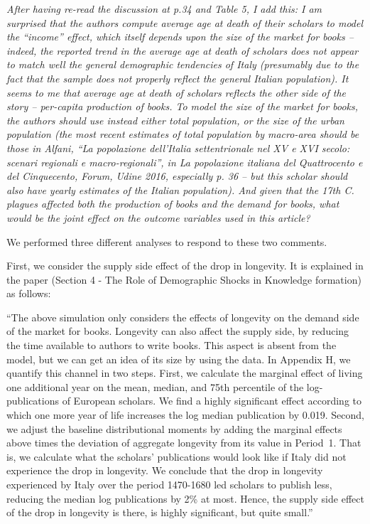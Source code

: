 \documentclass[12pt]{article}
\begin{document}
\textit{
After having re-read the discussion at p.34 and Table 5, I add this: I am surprised that the authors compute average age at death of their scholars to model the “income” effect, which itself depends upon the size of the market for books – indeed, the reported trend in the average age at death of scholars does not appear to match well the general demographic tendencies of Italy (presumably due to the fact that the sample does not properly reflect the general Italian population). It seems to me that average age at death of scholars reflects the other side of the story – per-capita production of books. To model the size of the market for books, the authors should use instead either total population, or the size of the urban population (the most recent estimates of total population by macro-area should be those in Alfani, “La popolazione dell’Italia settentrionale nel XV e XVI secolo: scenari regionali e macro-regionali”, in La popolazione italiana del Quattrocento e del Cinquecento, Forum, Udine 2016, especially p. 36 – but this scholar should also have yearly estimates of the Italian population). And given that the 17th C. plagues affected both the production of books and the demand for books, what would be the joint effect on the outcome variables used in this article?
}

We performed three different analyses to respond to these two comments.

First, we consider the supply side effect of the drop in longevity. It is explained in the paper (Section 4  - The Role of Demographic Shocks in Knowledge formation) as follows:

``The above simulation only considers the effects of longevity on the demand side of the market for books. Longevity can also affect the supply side, by reducing the time available to authors to write books. This aspect is absent from the model, but we can get an idea of its size by using the data. In Appendix H, we quantify this channel  in two steps. First, we calculate the marginal effect of living one additional year on the mean, median, and 75th percentile of the log-publications of European scholars. We find a highly significant effect according to which one more year of life increases the log median publication by 0.019.
Second, we adjust the baseline distributional moments by adding the marginal effects above times the deviation of aggregate longevity from its value in Period~1.
That is, we calculate what the scholars' publications would look like if Italy did not experience the drop in longevity. We conclude that the drop in longevity experienced by Italy over the period 1470-1680 led scholars to  publish less, reducing the median log publications by 2\% at most. Hence, the supply side effect of the drop in longevity is there, is highly significant, but quite small.''
\end{document}
